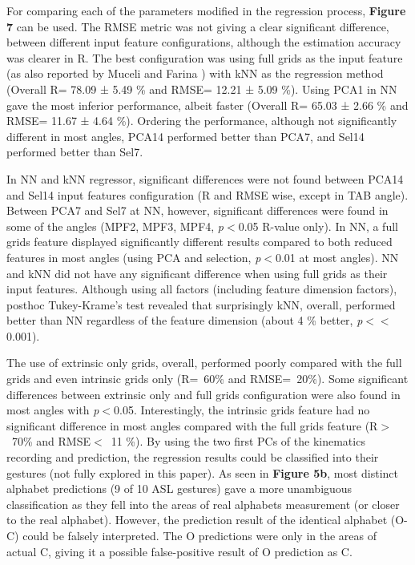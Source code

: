 \documentclass[conference]{IEEEtran}
\begin{document}
For comparing each of the parameters modified in the regression process, \textbf{Figure 7} can be used. The 
RMSE metric was not giving a clear significant difference, between different input feature configurations, 
although the estimation accuracy was clearer in R. The best configuration was using full grids as the input 
feature (as also reported by Muceli and Farina \cite{b9}) with kNN as the regression method (Overall R= 78.09 ± 
5.49 \% and RMSE= 12.21 ± 5.09 \%). Using PCA1 in NN gave the most inferior performance, albeit faster 
(Overall R= 65.03 ± 2.66 \% and RMSE= 11.67 ± 4.64 \%). Ordering the performance, although not 
significantly different in most angles, PCA14 performed better than PCA7, and Sel14 performed better than 
Sel7.

In NN and kNN regressor, significant differences were not found between PCA14 and Sel14 input 
features configuration (R and RMSE wise, except in TAB angle). Between PCA7 and Sel7 at NN, however, 
significant differences were found in some of the angles (MPF2, MPF3, MPF4, \textit{p}$<$0.05 R-value only). In 
NN, a full grids feature displayed significantly different results compared to both reduced features in most 
angles (using PCA and selection, \textit{p}$<$0.01 at most angles). NN and kNN did not have any significant 
difference when using full grids as their input features. Although using all factors (including feature 
dimension factors), posthoc Tukey-Krame’s test revealed that surprisingly kNN, overall, performed better 
than NN regardless of the feature dimension (about 4 \% better, \textit{p}$<$$<$0.001).

The use of extrinsic only grids, overall, performed poorly compared with the full grids and even 
intrinsic grids only (R=~60\% and RMSE=~20\%). Some significant differences between extrinsic only and 
full grids configuration were also found in most angles with \textit{p}$<$0.05. Interestingly, the intrinsic grids feature 
had no significant difference in most angles compared with the full grids feature (R$>$~70\% and RMSE$<$~11 \%). 
By using the two first PCs of the kinematics recording and prediction, the regression results could be 
classified into their gestures (not fully explored in this paper). As seen in \textbf{Figure 5b}, most distinct alphabet 
predictions (9 of 10 ASL gestures) gave a more unambiguous classification as they fell into the areas of real 
alphabets measurement (or closer to the real alphabet). However, the prediction result of the identical alphabet 
(O-C) could be falsely interpreted. The O predictions were only in the areas of actual C, giving it a possible 
false-positive result of O prediction as C.
\end{document}

